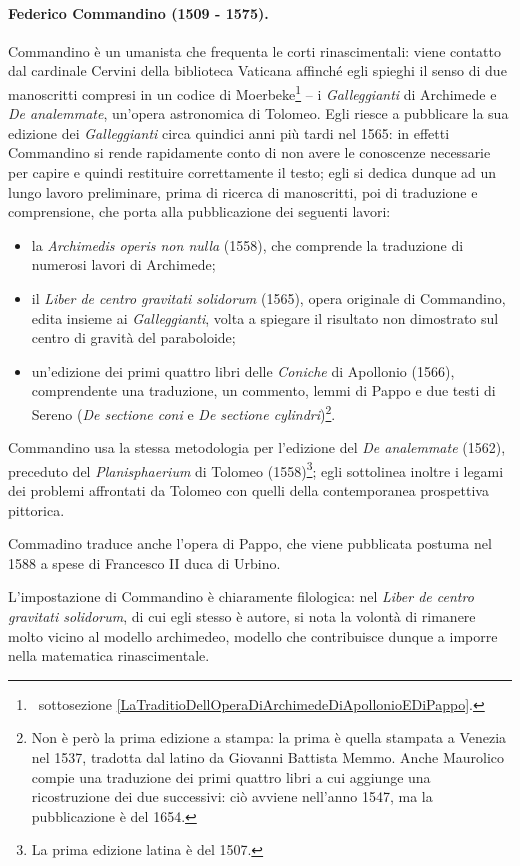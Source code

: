 \paragraph{Federico Commandino (1509 - 1575).} Commandino \`e un umanista che frequenta le corti rinascimentali: viene contatto dal cardinale Cervini della biblioteca Vaticana affinch\'e egli spieghi il senso di due manoscritti compresi in un codice di Moerbeke\footnote{\CFR\ sottosezione \ref{LaTraditioDellOperaDiArchimedeDiApollonioEDiPappo}.} -- i \textit{Galleggianti} di Archimede e \textit{De analemmate}, un'opera astronomica di Tolomeo. Egli riesce a pubblicare la sua edizione dei \textit{Galleggianti} circa quindici anni pi\`u tardi nel 1565: in effetti Commandino si rende rapidamente conto di non avere le conoscenze necessarie per capire e quindi restituire correttamente il testo; egli si dedica dunque ad un lungo lavoro preliminare, prima di ricerca di manoscritti, poi di traduzione e comprensione, che porta alla pubblicazione dei seguenti lavori:
\begin{itemize}
	\item la \textit{Archimedis operis non nulla} (1558), che comprende la traduzione di numerosi lavori di Archimede;
	\item il \textit{Liber de centro gravitati solidorum} (1565), opera originale di Commandino, edita insieme ai \textit{Galleggianti}, volta a spiegare il risultato non dimostrato sul centro di gravit\`a del paraboloide;
	\item un'edizione dei primi quattro libri delle \textit{Coniche} di Apollonio (1566), comprendente una traduzione, un commento, lemmi di Pappo e due testi di Sereno (\textit{De sectione coni} e \textit{De sectione cylindri})\footnote{Non \`e per\`o la prima edizione a stampa: la prima \`e quella stampata a Venezia nel 1537, tradotta dal latino da Giovanni Battista Memmo. Anche Maurolico compie una traduzione dei primi quattro libri a cui aggiunge una ricostruzione dei due successivi: ci\`o avviene nell'anno 1547, ma la pubblicazione \`e del 1654.}.
\end{itemize}
\par Commandino usa la stessa metodologia per l'edizione del \textit{De analemmate} (1562), preceduto del \textit{Planisphaerium} di Tolomeo (1558)\footnote{La prima edizione latina \`e del 1507.}; egli sottolinea inoltre i legami dei problemi affrontati da Tolomeo con quelli della contemporanea prospettiva pittorica.
\par Commadino traduce anche l'opera di Pappo, che viene pubblicata postuma nel 1588 a spese di Francesco II duca di Urbino.
\par L'impostazione di Commandino \`e chiaramente filologica: nel \textit{Liber de centro gravitati solidorum}, di cui egli stesso \`e autore, si nota la volont\`a di rimanere molto vicino al modello archimedeo, modello che contribuisce dunque a imporre nella matematica rinascimentale.
